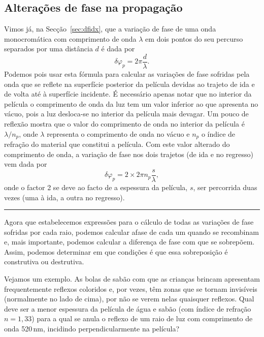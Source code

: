 \subsection*{Alterações de fase na propagação}
Vimos já, na Secção~\ref{sec:dfidx}, que a variação de fase de uma onda
monocromática com comprimento de onda $\lambda$ em dois pontos do seu percurso
separados por uma distância $d$ é dada por
\begin{equation*}
    \delta\varphi_p=2\pi\frac{d}{\lambda}.
\end{equation*}
Podemos pois usar esta fórmula para calcular as variações de fase sofridas pela
onda que se reflete na superfície posterior da película devidas ao trajeto de
ida e de volta até à superfície incidente. É necessário apenas notar que no
interior da película o comprimento de onda da luz tem um valor inferior ao que
apresenta no vácuo, pois a luz desloca-se no interior da película mais devagar.
Um pouco de reflexão mostra que o valor do comprimento de onda no interior da
película é $\lambda/n_p$, onde $\lambda$ representa o comprimento de onda no
vácuo e $n_p$ o índice de refração do material que constitui a película. Com
este valor alterado do comprimento de onda, a variação de fase nos dois
trajetos (de ida e no regresso) vem dada por
\begin{equation*}
\delta\varphi_p=2\times2\pi n_p\frac{s}{\lambda},
\end{equation*}
onde o factor 2 se deve ao facto de a espessura da película, $s$, ser percorrida
duas vezes (uma à ida, a outra no regresso).
\begin{center}
    \rule{2cm}{0.1mm}
\end{center}

Agora que estabelecemos expressões para o cálculo de todas as variações de fase
sofridas por cada raio, podemos calcular afase de cada um quando se recombinam
e, mais importante, podemos calcular a diferença de fase com que se sobrepõem.
Assim, podemos determinar em que condições é que essa sobreposição é construtiva
ou destrutiva.

Vejamos um exemplo. As bolas de sabão com que as crianças brincam apresentam
frequentemente reflexos coloridos e, por vezes, têm zonas que se tornam
invisíveis (normalmente no lado de cima), por não se verem nelas quaisquer
reflexos. Qual deve ser a menor espessura da película de água e sabão (com
índice de refração $n=1,33$) para a qual se anula o reflexo de um raio de luz
com comprimento de onda 520\,nm, incidindo perpendicularmente na película?

